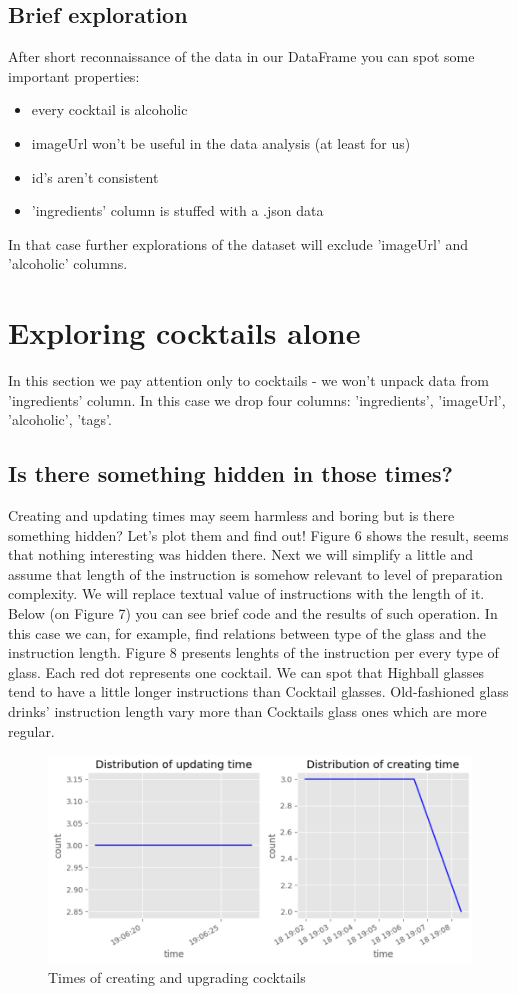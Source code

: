 \documentclass[a4paper]{article}
\begin{document}
\subsection{Brief exploration}
After short reconnaissance of the data in our DataFrame you can spot some important properties:
\begin{itemize}
    \item every cocktail is alcoholic
    \item imageUrl won't be useful in the data analysis (at least for us)
    \item id's aren't consistent
    \item 'ingredients' column is stuffed with a .json data
\end{itemize}
In that case further explorations of the dataset will exclude 'imageUrl' and 'alcoholic' columns.

\section{Exploring cocktails alone}
In this section we pay attention only to cocktails - we won't unpack data from 'ingredients' column. In this case we drop four columns: 'ingredients', 'imageUrl', 'alcoholic', 'tags'.
\subsection{Is there something hidden in those times?}
Creating and updating times may seem harmless and boring but is there something hidden? Let's plot them and find out! Figure 6 shows the result, seems that nothing interesting was hidden there. Next we will simplify a little and assume that length of the instruction is somehow relevant to level of preparation complexity. We will replace textual value of instructions with the length of it. Below (on Figure 7) you can see brief code and the results of such operation. In this case we can, for example, find relations between type of the glass and the instruction length. Figure 8 presents lenghts of the instruction per every type of glass. Each red dot represents one cocktail. We can spot that Highball glasses tend to have a little longer instructions than Cocktail glasses. Old-fashioned glass drinks' instruction length vary more than Cocktails glass ones which are more regular.
\vspace{4cm}

\begin{figure}[H]
    \centering
    \includegraphics[width=0.8\linewidth]{times cocktails.png}
    \caption{Times of creating and upgrading cocktails}
    \label{fig:enter-label}
\end{figure}
\end{document}
